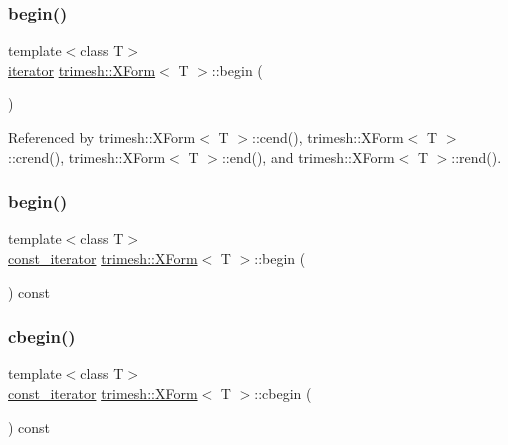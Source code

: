 \subsubsection{\texorpdfstring{begin()}{begin()}\hspace{0.1cm}{\footnotesize\ttfamily [1/2]}}
{\footnotesize\ttfamily template$<$class T$>$ \\
\hyperlink{classtrimesh_1_1XForm_a8894e55e986e53231663e774060ca200}{iterator} \hyperlink{classtrimesh_1_1XForm}{trimesh\+::\+X\+Form}$<$ T $>$\+::begin (\begin{DoxyParamCaption}{ }\end{DoxyParamCaption})\hspace{0.3cm}{\ttfamily [inline]}}



Referenced by trimesh\+::\+X\+Form$<$ T $>$\+::cend(), trimesh\+::\+X\+Form$<$ T $>$\+::crend(), trimesh\+::\+X\+Form$<$ T $>$\+::end(), and trimesh\+::\+X\+Form$<$ T $>$\+::rend().

\mbox{\label{classtrimesh_1_1XForm_a34ec57124b453b83f4941537eb112c54}} 
\subsubsection{\texorpdfstring{begin()}{begin()}\hspace{0.1cm}{\footnotesize\ttfamily [2/2]}}
{\footnotesize\ttfamily template$<$class T$>$ \\
\hyperlink{classtrimesh_1_1XForm_af342cefd0ecc382861c2d89f24423d71}{const\+\_\+iterator} \hyperlink{classtrimesh_1_1XForm}{trimesh\+::\+X\+Form}$<$ T $>$\+::begin (\begin{DoxyParamCaption}{ }\end{DoxyParamCaption}) const\hspace{0.3cm}{\ttfamily [inline]}}

\mbox{\label{classtrimesh_1_1XForm_ac1b00950e877fe703998bca3e5cfefc1}} 
\subsubsection{\texorpdfstring{cbegin()}{cbegin()}}
{\footnotesize\ttfamily template$<$class T$>$ \\
\hyperlink{classtrimesh_1_1XForm_af342cefd0ecc382861c2d89f24423d71}{const\+\_\+iterator} \hyperlink{classtrimesh_1_1XForm}{trimesh\+::\+X\+Form}$<$ T $>$\+::cbegin (\begin{DoxyParamCaption}{ }\end{DoxyParamCaption}) const\hspace{0.3cm}{\ttfamily [inline]}}

